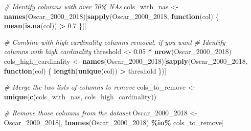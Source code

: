 \documentclass[
]{article}
\newenvironment{Shaded}{\begin{snugshade}}{\end{snugshade}}
\newcommand{\CommentTok}[1]{\textcolor[rgb]{0.56,0.35,0.01}{\textit{#1}}}
\newcommand{\ControlFlowTok}[1]{\textcolor[rgb]{0.13,0.29,0.53}{\textbf{#1}}}
\newcommand{\DecValTok}[1]{\textcolor[rgb]{0.00,0.00,0.81}{#1}}
\newcommand{\FloatTok}[1]{\textcolor[rgb]{0.00,0.00,0.81}{#1}}
\newcommand{\FunctionTok}[1]{\textcolor[rgb]{0.13,0.29,0.53}{\textbf{#1}}}
\newcommand{\NormalTok}[1]{#1}
\newcommand{\OtherTok}[1]{\textcolor[rgb]{0.56,0.35,0.01}{#1}}
\newcommand{\SpecialCharTok}[1]{\textcolor[rgb]{0.81,0.36,0.00}{\textbf{#1}}}
\newcommand{\StringTok}[1]{\textcolor[rgb]{0.31,0.60,0.02}{#1}}
\begin{document}
\begin{Shaded}
\begin{Highlighting}[]
\CommentTok{\# Identify columns with over 70\% NAs}
\NormalTok{cols\_with\_nas }\OtherTok{\textless{}{-}} \FunctionTok{names}\NormalTok{(Oscar\_2000\_2018)[}\FunctionTok{sapply}\NormalTok{(Oscar\_2000\_2018, }\ControlFlowTok{function}\NormalTok{(col) \{}
  \FunctionTok{mean}\NormalTok{(}\FunctionTok{is.na}\NormalTok{(col)) }\SpecialCharTok{\textgreater{}} \FloatTok{0.7}
\NormalTok{\})]}

\CommentTok{\# Combine with high cardinality columns removal, if you want}
\CommentTok{\# Identify columns with high cardinality}
\NormalTok{threshold }\OtherTok{\textless{}{-}} \FloatTok{0.05} \SpecialCharTok{*} \FunctionTok{nrow}\NormalTok{(Oscar\_2000\_2018)}
\NormalTok{cols\_high\_cardinality }\OtherTok{\textless{}{-}} \FunctionTok{names}\NormalTok{(Oscar\_2000\_2018)[}\FunctionTok{sapply}\NormalTok{(Oscar\_2000\_2018, }\ControlFlowTok{function}\NormalTok{(col) \{}
  \FunctionTok{length}\NormalTok{(}\FunctionTok{unique}\NormalTok{(col)) }\SpecialCharTok{\textgreater{}}\NormalTok{ threshold}
\NormalTok{\})]}

\CommentTok{\# Merge the two lists of columns to remove}
\NormalTok{cols\_to\_remove }\OtherTok{\textless{}{-}} \FunctionTok{unique}\NormalTok{(}\FunctionTok{c}\NormalTok{(cols\_with\_nas, cols\_high\_cardinality))}

\CommentTok{\# Remove those columns from the dataset}
\NormalTok{Oscar\_2000\_2018 }\OtherTok{\textless{}{-}}\NormalTok{ Oscar\_2000\_2018[, }\SpecialCharTok{!}\FunctionTok{names}\NormalTok{(Oscar\_2000\_2018) }\SpecialCharTok{\%in\%}\NormalTok{ cols\_to\_remove]}
\end{Highlighting}
\end{Shaded}

\begin{Shaded}
\end{Shaded}
\end{document}
